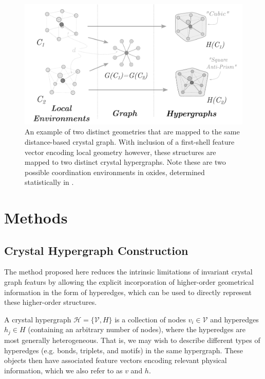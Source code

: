 \documentclass[twoside,twocolumn,9pt]{article}
\begin{document}
\begin{figure}
	\centering
	\includegraphics[scale=0.7]{graph2hgraph_tall_revise2.pdf}
	\caption{An example of two distinct geometries that are mapped to the same distance-based crystal graph. With inclusion of a first-shell feature vector encoding local geometry however, these structures are mapped to two distinct crystal hypergraphs. Note these are two possible coordination environments in oxides, determined statistically in \cite{motifstats}.}
	\label{fig:graph_cntex}
\end{figure}

\section{Methods}

\subsection{Crystal Hypergraph Construction}
The method proposed here reduces the intrinsic limitations of invariant crystal graph featurs by allowing the explicit incorporation of higher-order geometrical information in the form of hyperedges, which can be used to directly represent these higher-order structures.


A crystal hypergraph $\mathcal{H}=\lbrace\mathcal{V}, \mathit{H} \rbrace$ is a collection of nodes $v_i\in \mathcal{V}$ and hyperedges $h_j\in \mathit{H}$ (containing an arbitrary number of nodes), where the hyperedges are most generally heterogeneous. That is, we may wish to describe different types of hyperedges (e.g. bonds, triplets, and motifs) in the same hypergraph. These objects then have associated feature vectors encoding relevant physical information, which we also refer to as $v$ and $h$.
\end{document}

